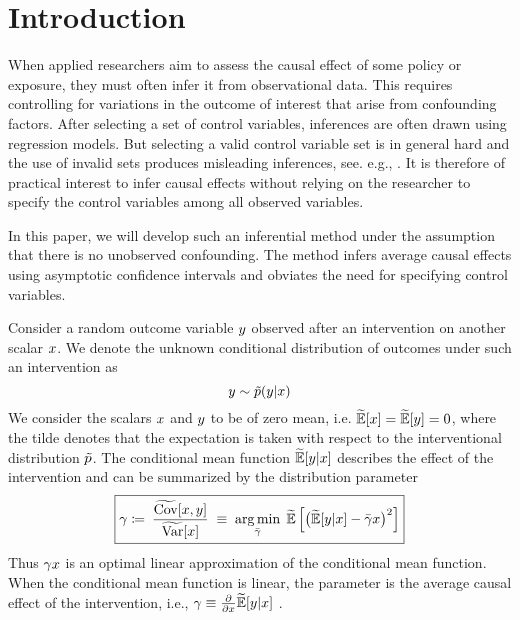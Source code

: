\section{Introduction}
When applied researchers aim to assess the causal effect of some policy or exposure, they must often infer it from observational data. This requires controlling for variations in the outcome of interest that arise from confounding factors. After selecting a set of control variables, inferences are often drawn using regression models. But selecting a valid control variable set is in general hard and the use of invalid sets produces misleading inferences, see. e.g., \citet{carlson_illusion_2012,berneth_acritical_2016}. It is therefore of practical interest to infer causal effects without relying on the researcher to specify the control variables among all observed variables. 

In this paper, we will develop such an inferential method under the assumption that there is no unobserved confounding. The method infers average causal effects using asymptotic confidence intervals and obviates the need for specifying control variables.
 
Consider a random outcome variable $y$ observed after an intervention on another scalar $x$. We denote the unknown conditional distribution of outcomes under such an intervention as
\[y \sim \tilde p(y | x)\]
We consider the scalars $x$ and $y$ to be of zero mean, i.e. $\widetilde{\mathbb{E}}[x]=\widetilde{\mathbb{E}}[y]=0$, where the tilde denotes that the expectation is taken with respect to the interventional distribution $\tilde p$.
The conditional mean function $\widetilde{\mathbb{E}}[y|x]$ describes the effect of the intervention and can be summarized by the distribution parameter
\begin{align}
\boxed{\gamma \coloneqq \: \frac{\widetilde{\text{Cov}}[x,  y]}{\widetilde{\text{Var}}[x]} \; \equiv \;  \operatorname*{arg\,min}_{\bar{\gamma}} \; \widetilde{\mathbb{E}}\left[ \big( \widetilde{\mathbb{E}}[y|x]  - \bar{\gamma}x \big)^2 \right]}
\end{align}
Thus $\gamma x$ is an optimal linear approximation of the conditional mean function. When the conditional mean function is linear, the parameter is the average causal effect of the intervention, i.e., $\gamma \equiv \frac{\partial}{\partial x } \widetilde{\mathbb{E}}[y|x]$  \citep{angrist_mostly_2009,pearl_causality:_2009}.

